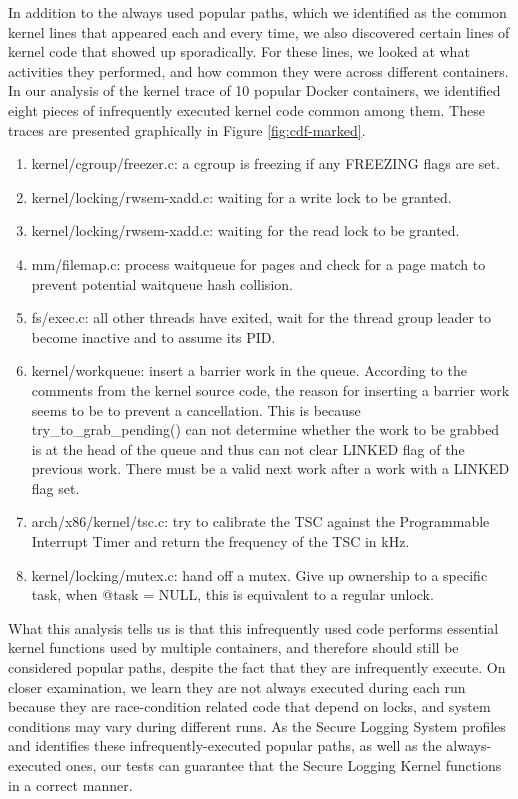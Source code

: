 In addition to the always used popular paths, which we identified as the common kernel lines that appeared each and every time, 
we also discovered certain lines of kernel code that showed up sporadically. 
For these lines, we looked at what activities they performed, and how common they were across different containers. 
In our analysis of the kernel trace of 10 popular Docker containers, we identified eight pieces of infrequently executed kernel code common among them. 
These traces are presented graphically in Figure \ref{fig:cdf-marked}. 
\begin{enumerate}
	\item kernel/cgroup/freezer.c: a cgroup is freezing if any FREEZING flags are set.
	\item kernel/locking/rwsem-xadd.c: waiting for a write lock to be granted. 
	\item kernel/locking/rwsem-xadd.c: waiting for the read lock to be granted.
	\item mm/filemap.c: process waitqueue for pages and check for a page match to prevent potential waitqueue hash collision. 
	\item fs/exec.c: all other threads have exited, wait for the thread group leader to become inactive and to assume its PID. 
	\item kernel/workqueue: insert a barrier work in the queue. According to the comments from the kernel source code, 
	the reason for inserting a barrier work seems to be to prevent a cancellation. 
	This is because try\_to\_grab\_pending() can not determine whether the work to be grabbed is at the head of the queue and thus can not clear LINKED flag of the previous work. 
	There must be a valid next work after a work with a LINKED flag set. 
	\item arch/x86/kernel/tsc.c: try to calibrate the TSC against the Programmable Interrupt Timer and return the frequency of the TSC in kHz. 
	\item kernel/locking/mutex.c: hand off a mutex. Give up ownership to a specific task, when @task = NULL, this is equivalent to a regular unlock.
\end{enumerate}

What this analysis tells us is that this infrequently used code performs essential kernel functions used by multiple containers, and therefore should still be considered popular paths, 
despite the fact that they are infrequently execute. 
On closer examination, we learn they are not always executed during each run because they are race-condition related code that depend on locks, and system conditions may vary during different runs. 
As the Secure Logging System profiles and identifies these infrequently-executed popular paths, as well as the always-executed ones, 
our tests can guarantee that the Secure Logging Kernel functions in a correct manner.


